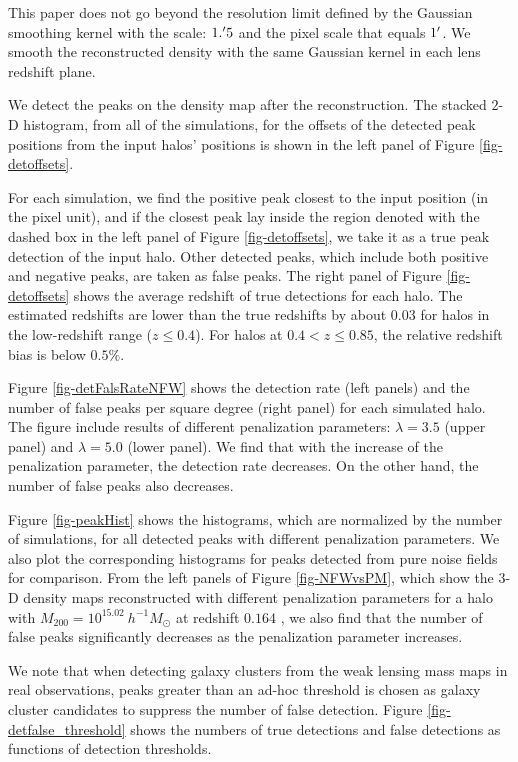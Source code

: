 \documentclass[twocolumn]{aastex62}
\begin{document}
This paper does not go beyond the resolution limit defined by the Gaussian
smoothing kernel with the scale: $1.\mbox{$^\prime$} 5$ and the pixel scale
that equals $1\mbox{$^\prime$}$. We smooth the reconstructed density with the same
Gaussian kernel in each lens redshift plane.

We detect the peaks on the density map after the reconstruction. The stacked
$2$-D histogram, from all of the simulations, for the offsets of the detected
peak positions from the input halos' positions is shown in the left panel of
Figure \ref{fig-detoffsets}.

For each simulation, we find the positive peak closest to the input position
(in the pixel unit), and if the closest peak lay inside the region denoted with
the dashed box in the left panel of Figure \ref{fig-detoffsets}, we take it as
a true peak detection of the input halo. Other detected peaks, which include both
positive and negative peaks, are taken as false peaks. The right
panel of Figure \ref{fig-detoffsets} shows the average redshift of true
detections for each halo. The estimated redshifts are lower than the true
redshifts by about $0.03$ for halos in the low-redshift range ($z\leq 0.4$).
For halos at $0.4<z\leq 0.85$, the relative redshift bias is below $0.5\%$.

Figure \ref{fig-detFalsRateNFW} shows the detection rate (left panels) and the
number of false peaks per square degree (right panel) for each simulated halo.
The figure include results of different penalization parameters: $\lambda=3.5$
(upper panel) and $\lambda=5.0$ (lower panel).  We find that with the increase
of the penalization parameter, the detection rate decreases. On the other hand,
the number of false peaks also decreases.

Figure \ref{fig-peakHist} shows the histograms, which are normalized by the
number of simulations, for all detected peaks with different penalization
parameters. We also plot the corresponding histograms for peaks detected from
pure noise fields for comparison. From the left panels of Figure
\ref{fig-NFWvsPM}, which show the $3$-D density maps reconstructed with
different penalization parameters for a halo with $M_{200}=10^{15.02}
~h^{-1}M_{\odot}$ at redshift $0.164$ , we also find that the number of false
peaks significantly decreases as the penalization parameter increases.

We note that when detecting galaxy clusters from the weak lensing mass maps in
real observations\citep{HSC1-massMap-cluster}, peaks greater than an ad-hoc
threshold is chosen as galaxy cluster candidates to suppress the number of
false detection. Figure \ref{fig-detfalse_threshold} shows the numbers of true
detections and false detections as functions of detection thresholds.
\end{document}
